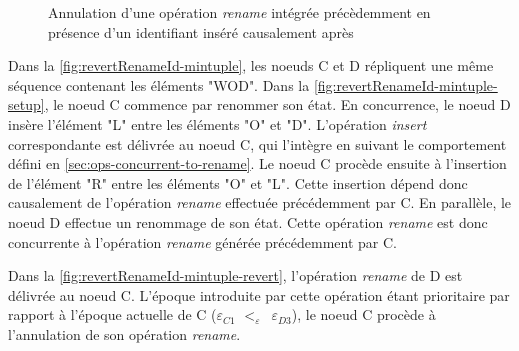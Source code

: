 \documentclass[12pt]{thesul}
\newcommand{\trm}[1]{\mathit{#1}}
\newcommand{\id}[3]{$\trm{#1}^{\trm{#2}}_{\trm{#3}}$}
\newcommand{\epoch}[1]{$\varepsilon_{#1}$}
\newcommand{\lepoch}{$<_{\varepsilon}$~}
\newcommand{\widthletter}{2em}
\newcommand{\widthepoch}{1.65em}
\begin{document}
\begin{figure}[!ht]
{\begin{minipage}{\linewidth}
{
        }
        \label{fig:revertRenameId-mintuple-revert}
    \end{minipage}}
  \caption{Annulation d'une opération \emph{rename} intégrée précèdemment en présence d'un identifiant inséré causalement après}
  \label{fig:revertRenameId-mintuple}
\end{figure}

Dans la \autoref{fig:revertRenameId-mintuple}, les noeuds C et D répliquent une même séquence contenant les éléments "WOD".
Dans la \autoref{fig:revertRenameId-mintuple-setup}, le noeud C commence par renommer son état.
En concurrence, le noeud D insère l'élément "L" entre les éléments "O" et "D".
L'opération \emph{insert} correspondante est délivrée au noeud C, qui l'intègre en suivant le comportement défini en \autoref{sec:ops-concurrent-to-rename}.
Le noeud C procède ensuite à l'insertion de l'élément "R" entre les éléments "O" et "L".
Cette insertion dépend donc causalement de l'opération \emph{rename} effectuée précédemment par C.
En parallèle, le noeud D effectue un renommage de son état.
Cette opération \emph{rename} est donc concurrente à l'opération \emph{rename} générée précédemment par C.

Dans la \autoref{fig:revertRenameId-mintuple-revert}, l'opération \emph{rename} de D est délivrée au noeud C.
L'époque introduite par cette opération étant prioritaire par rapport à l'époque actuelle de C (\epoch{C1} \lepoch \epoch{D3}), le noeud C procède à l'annulation de son opération \emph{rename}.
\end{document}
